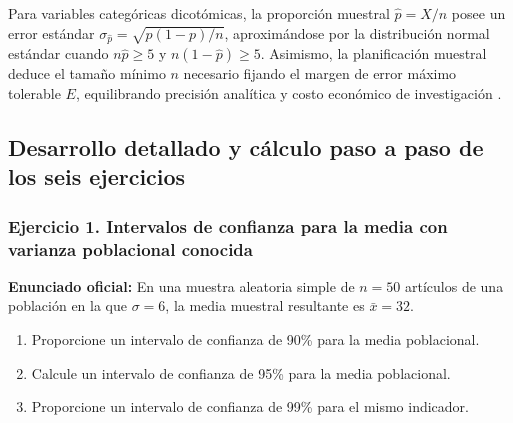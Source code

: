 {Para variables categóricas dicotómicas, la proporción muestral $\hat{p} = X/n$ posee un error estándar $\sigma_{\hat{p}} = \sqrt{p(1-p)/n}$, aproximándose por la distribución normal estándar cuando $n\hat{p} \ge 5$ y $n(1-\hat{p}) \ge 5$. Asimismo, la planificación muestral deduce el tamaño mínimo $n$ necesario fijando el margen de error máximo tolerable $E$, equilibrando precisión analítica y costo económico de investigación \citep{anderson2012}.

\subsection{Desarrollo detallado y cálculo paso a paso de los seis ejercicios}

\subsubsection*{Ejercicio 1. Intervalos de confianza para la media con varianza poblacional conocida}
\textbf{Enunciado oficial:} En una muestra aleatoria simple de $n = 50$ artículos de una población en la que $\sigma = 6$, la media muestral resultante es $\bar{x} = 32$.
\begin{enumerate}
  \item[a)] Proporcione un intervalo de confianza de 90\% para la media poblacional.
  \item[b)] Calcule un intervalo de confianza de 95\% para la media poblacional.
  \item[c)] Proporcione un intervalo de confianza de 99\% para el mismo indicador.
\end{enumerate}

}
